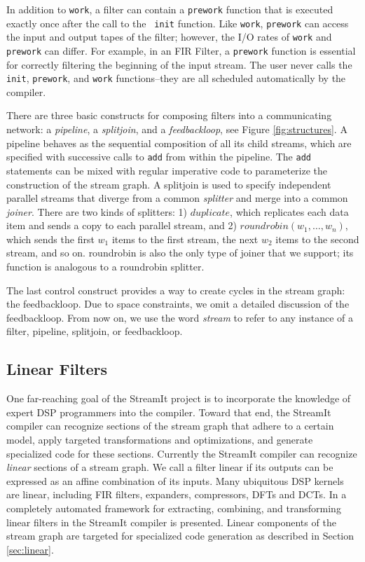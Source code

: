In addition to {\tt work}, a filter can contain a {\tt prework}
function that is executed exactly once after the call to the {\tt
init} function.  Like {\tt work}, {\tt prework} can access the input and
output tapes of the filter; however, the I/O rates of {\tt work} and
{\tt prework} can differ.  For example, in an FIR Filter, a {\tt prework}
function is essential for correctly filtering the beginning of the
input stream.  The user never calls the {\tt init}, {\tt prework}, and
{\tt work} functions--they are all scheduled automatically by the compiler.

There are three basic constructs for composing filters into a
communicating network: a {\it pipeline}, a {\it splitjoin}, and a {\it
feedbackloop}, see Figure \ref{fig:structures}.  A pipeline behaves as
the sequential composition of all its child streams, which are
specified with successive calls to {\tt add} from within the pipeline.
The {\tt add} statements can be mixed with regular imperative code to
parameterize the construction of the stream graph. A splitjoin is used
to specify independent parallel streams that diverge from a common
{\it splitter} and merge into a common {\it joiner}.  There are two
kinds of splitters: 1) $duplicate$, which replicates each data item
and sends a copy to each parallel stream, and 2) $roundrobin(w_1,
\dots, w_n)$, which sends the first $w_1$ items to the first stream,
the next $w_2$ items to the second stream, and so on. roundrobin is
also the only type of joiner that we support; its function is
analogous to a roundrobin splitter.

The last control construct provides a way to create cycles in the
stream graph: the feedbackloop.  Due to space constraints, we omit a
detailed discussion of the feedbackloop. From now on, we use the word
{\it stream} to refer to any instance of a filter, pipeline,
splitjoin, or feedbackloop.

\subsection{Linear Filters}
One far-reaching goal of the StreamIt project is to incorporate the
knowledge of expert DSP programmers into the compiler.  Toward that
end, the StreamIt compiler can recognize sections of the stream graph
that adhere to a certain model, apply targeted transformations and
optimizations, and generate specialized code for these sections.
Currently the StreamIt compiler can recognize {\it linear} sections of
a stream graph. We call a filter linear if its outputs can be
expressed as an affine combination of its inputs.  Many ubiquitous DSP
kernels are linear, including FIR filters, expanders, compressors,
DFTs and DCTs.  In \cite{streamit-linear} a completely automated
framework for extracting, combining, and transforming linear filters
in the StreamIt compiler is presented.  Linear components of the
stream graph are targeted for specialized code generation as described
in Section
\ref{sec:linear}.

